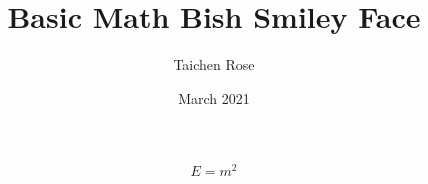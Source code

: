 \documentclass{article}
\title{Basic Math Bish Smiley Face}
\author{Taichen Rose}
\date{March 2021}
\begin{document}
\begin{equation}
E=m^2
\end{equation}
\end{document}
